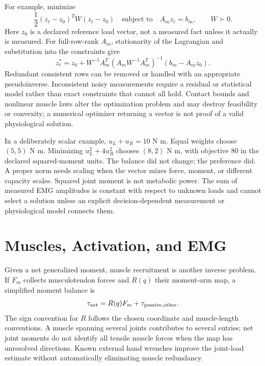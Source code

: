 For example, minimize
\begin{equation}
 \frac12(z_\ell-z_0)^TW(z_\ell-z_0)
 \quad\text{subject to}\quad A_mz_\ell=b_m,
 \qquad W\succ0.
 \label{eq:weighted_load_optimization}
\end{equation}
Here $z_0$ is a declared reference load vector, not a measured fact unless it
actually is measured. For full-row-rank $A_m$, stationarity of the Lagrangian
and substitution into the constraints give
\begin{equation}
 z_\ell^*=z_0+W^{-1}A_m^T
 (A_mW^{-1}A_m^T)^{-1}(b_m-A_mz_0).
 \label{eq:weighted_load_solution}
\end{equation}
Redundant consistent rows can be removed or handled with an appropriate
pseudoinverse. Inconsistent noisy measurements require a residual or statistical
model rather than exact constraints that cannot all hold. Contact bounds and
nonlinear muscle laws alter the optimization problem and may destroy feasibility
or convexity; a numerical optimizer returning a vector is not proof of a valid
physiological solution.

In a deliberately scalar example, $u_L+u_R=10$ N m. Equal weights choose
$(5,5)$ N m. Minimizing $u_L^2+4u_R^2$ chooses $(8,2)$ N m, with objective
80 in the declared squared-moment units. The balance did not change; the
preference did. A proper norm needs scaling when the vector mixes force,
moment, or different capacity scales. Squared joint moment is not metabolic
power. The sum of measured EMG amplitudes is constant with respect to unknown
loads and cannot select a solution unless an explicit decision-dependent
measurement or physiological model connects them.

\section{Muscles, Activation, and EMG}
\label{subsec:approach_emg}

Given a net generalized moment, muscle recruitment is another inverse problem.
If $F_m$ collects musculotendon forces and $R(q)$ their moment-arm map, a
simplified moment balance is
\begin{equation}
 \tau_{\rm net}=R(q)F_m+\tau_{\rm passive,other}.
 \label{eq:muscle_inverse_mapping}
\end{equation}
The sign convention for $R$ follows the chosen coordinate and muscle-length
conventions. A muscle spanning several joints contributes to several entries;
net joint moments do not identify all tensile muscle forces when the map has
unresolved directions. Known external hand wrenches improve the joint-load
estimate without automatically eliminating muscle redundancy.

